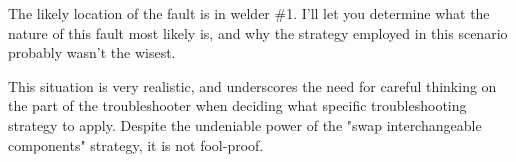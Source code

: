 





The likely location of the fault is in welder \#1.  I'll let you determine what the nature of this fault most likely is, and why the strategy employed in this scenario probably wasn't the wisest.







This situation is very realistic, and underscores the need for careful thinking on the part of the troubleshooter when deciding what specific troubleshooting strategy to apply.  Despite the undeniable power of the "swap interchangeable components" strategy, it is not fool-proof.





